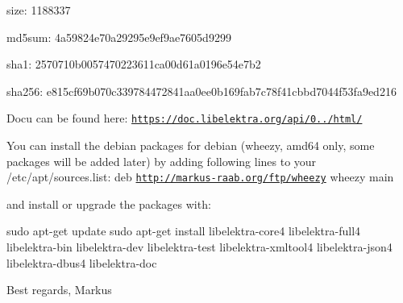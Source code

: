 \begin{DoxyItemize}
\item size\+: 1188337
\item md5sum\+: 4a59824e70a29295e9ef9ae7605d9299
\item sha1\+: 2570710b0057470223611ca00d61a0196e54e7b2
\item sha256\+: e815cf69b070c339784472841aa0ee0b169fab7c78f41cbbd7044f53fa9ed216
\end{DoxyItemize}

Docu can be found here\+: \href{https://doc.libelektra.org/api/0.8.6/html/}{\tt https\+://doc.\+libelektra.\+org/api/0../html/}

You can install the debian packages for debian (wheezy, amd64 only, some packages will be added later) by adding following lines to your /etc/apt/sources.list\+: deb \href{http://markus-raab.org/ftp/wheezy}{\tt http\+://markus-\/raab.\+org/ftp/wheezy} wheezy main

and install or upgrade the packages with\+:


\begin{DoxyCode}
sudo apt-get update
sudo apt-get install libelektra-core4 libelektra-full4 libelektra-bin libelektra-dev libelektra-test
       libelektra-xmltool4 libelektra-json4 libelektra-dbus4 libelektra-doc
\end{DoxyCode}


Best regards, Markus 